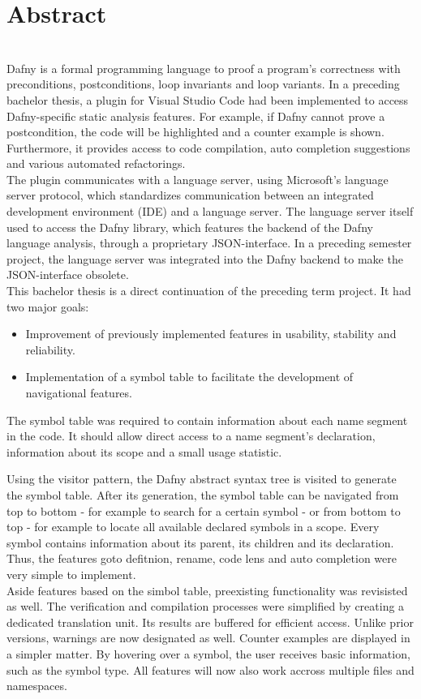 \section{Abstract}
\label{section:abstract}
\\

Dafny is a formal programming language to proof a program's correctness with preconditions, postconditions, loop invariants and loop variants. In a preceding bachelor thesis, a plugin for Visual Studio Code had been implemented to access Dafny-specific static analysis features. For example, if Dafny cannot prove a postcondition, the code will be highlighted and a counter example is shown. Furthermore, it provides access to code compilation, auto completion suggestions and various automated refactorings.\\

The plugin communicates with a language server, using Microsoft's language server protocol, which standardizes communication between an integrated development environment (IDE) and a language server.  The language server itself used to access the Dafny library, which features the backend of the Dafny language analysis, through a proprietary JSON-interface. In a preceding semester project, the language server was integrated into the Dafny backend to make the JSON-interface obsolete.\\

This bachelor thesis is a direct continuation of the preceding term project. It had two major goals:
\begin{itemize}
    \item Improvement of previously implemented features in usability, stability and reliability.
    \item Implementation of a symbol table to facilitate the development of navigational features.
\end{itemize}
The symbol table was required to contain information about each name segment in the code. It should allow direct access to a name segment's declaration, information about its scope and a small usage statistic.

Using the visitor pattern, the Dafny abstract syntax tree is visited to generate the symbol table. After its generation, the symbol table can be navigated from top to bottom - for example to search for a certain symbol - or from bottom to top - for example to locate all available declared symbols in a scope. Every symbol contains information about its parent, its children and its declaration. Thus, the features goto defitnion, rename, code lens and auto completion were very simple to implement.\\

Aside features based on the simbol table, preexisting functionality was revisisted as well. The verification and compilation processes were simplified by creating a dedicated translation unit. Its results are buffered for efficient access. Unlike prior versions, warnings are now designated as well. Counter examples are displayed in a simpler matter. By hovering over a symbol, the user receives basic information, such as the symbol type. All features will now also work accross multiple files and namespaces.